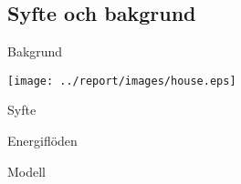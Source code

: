 \subsection{Syfte och bakgrund}

\begin{frame}{Bakgrund}

  \begin{center}
    \texttt{[image: ../report/images/house.eps]}
  \end{center}

\end{frame}

\begin{frame}{Syfte}

\begin{center}
\Huge{
Energiflöden

\vskip1.3cm

Modell
}
\end{center}


\end{frame}